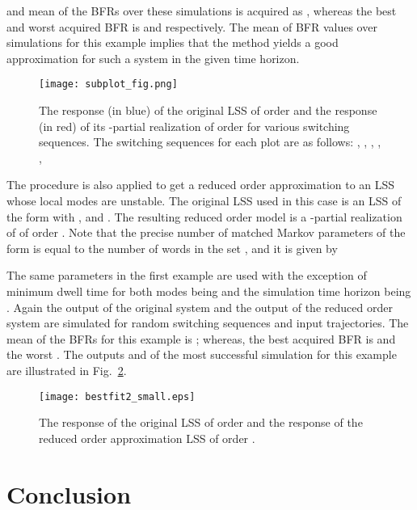 \documentclass[journal]{IEEEtran}
\begin{document}
and mean of the BFRs over these  simulations is acquired as , whereas the best and worst acquired BFR is  and  respectively. The mean of BFR values over  simulations for this example implies that the method yields a good approximation for such a system  in the given time horizon.
\begin{figure}
	\centering
	\texttt{[image: subplot\_fig.png]}
	\caption{The response  (in blue) of the original LSS  of order  and the response  (in red) of its -partial realization  of order  for various switching sequences. The switching sequences  for each plot are as follows:  ,  ,  ,  ,  ,  }
	\label{fig:example1}
\end{figure}

The procedure is also applied to get a reduced order approximation to an LSS whose local modes are unstable. The original LSS used in this case is an LSS of the form  with ,  and . The resulting reduced order model  is a -partial realization of  of order . Note that the precise number of matched Markov parameters of the form  is equal to the number of words in the set , and it is given by

The same parameters in the first example are used with the exception of minimum dwell time for both modes being  and the simulation time horizon being . Again the output  of the original system  and the output  of the reduced order system  are simulated for  random switching sequences and input trajectories. The mean of the BFRs for this example is ; whereas, the best acquired BFR is  and the worst . The outputs  and  of the most successful simulation for this example are illustrated in Fig.~\ref{fig:example2}.
\begin{figure}
	\centering
	\texttt{[image: bestfit2\_small.eps]}
	\caption{The response  of the original LSS  of order  and the response  of the reduced order approximation LSS  of order .}
	\label{fig:example2}
\end{figure}



















\section{Conclusion}
\label{sec:conc}
\end{document}
